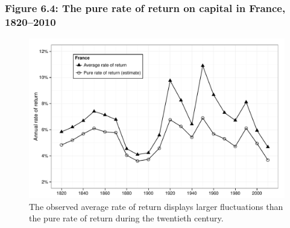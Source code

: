 \documentclass[t]{beamer}\usepackage[]{graphicx}\usepackage[]{color}
\newenvironment{knitrout}{}{} %
\begin{document}
\begin{frame}[label=Figure_6_4]
\frametitle{Figure 6.4: The pure rate of return on capital in France, 1820--2010}
\begin{figure}[t]
\begin{minipage}[b]{\textwidth}
\centering
\begin{knitrout}\footnotesize
{}\color{fgcolor}

{\centering \includegraphics[width=1\linewidth]{figures/bw/Figure_6_4} 

}



\end{knitrout}
\caption{The observed average rate of return displays larger fluctuations than the pure rate of return during the twentieth century.}
\end{minipage}
\end{figure}
\end{frame}
\end{document}
